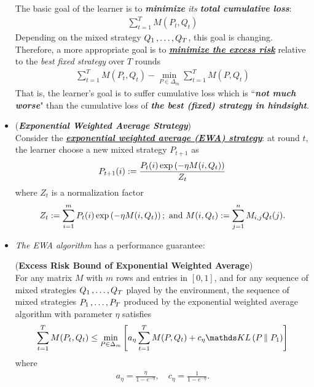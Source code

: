 \documentclass[11pt]{article}
\begin{document}
\begin{itemize}
\begin{remark}
The basic goal of the learner is to \emph{\textbf{minimize} its \textbf{total cumulative loss}}:
\begin{align*}
 \sum_{t=1}^{T}M(P_t, Q_t) 
\end{align*} Depending on the mixed strategy $Q_1 \,{,}\ldots{,}\, Q_T$, this goal is changing. Therefore, a more appropriate goal is to \underline{\emph{\textbf{minimize the excess risk}}} relative to the \emph{best fixed strategy}  over $T$ rounds
\begin{align}
\sum_{t=1}^{T}M(P_t, Q_t)  - \min_{P \in \Delta_m}\sum_{t=1}^{T}M(P, Q_t) \label{def: excess_risk_two_player_seq_game}
\end{align} That is, the learner's goal is to suffer cumulative loss which is ``\emph{\textbf{not much worse}}" than the cumulative loss of \emph{\textbf{the best (fixed) strategy in hindsight}}.
\end{remark}

\item \begin{remark}(\textbf{\emph{Exponential Weighted Average Strategy}}) \citep{cesa2006prediction} \\
Consider the \underline{\emph{\textbf{exponential weighted average (EWA) strategy}}}: at round $t$, the learner choose a new mixed strategy $P_{t+1}$ as
\begin{align*}
P_{t+1}(i) := \frac{P_{t}(i) \exp\left(- \eta M(i, Q_t)\right)}{Z_t}
\end{align*} where $Z_t$ is a normalization factor
\begin{align*}
Z_t := \sum_{i=1}^{m}P_{t}(i) \exp\left(- \eta M(i, Q_t)\right); \text{ and } M(i, Q_t) := \sum_{j=1}^{n}M_{i,j}Q_t(j).
\end{align*}
\end{remark}

\item \emph{The EWA algorithm} has a performance guarantee:
\begin{theorem} (\textbf{Excess Risk Bound of Exponential Weighted Average})  \citep{schapire2012boosting}\\
For any matrix $M$ with $m$ rows and entries in $[0, 1]$, and for any sequence of mixed strategies $Q_1 \,{,}\ldots{,}\, Q_T$ played by the environment, the sequence of mixed strategies $P_1 \,{,}\ldots{,}\, P_T$ produced by the exponential weighted average algorithm  with parameter $\eta$ satisfies
\begin{align}
\sum_{t=1}^{T}M(P_t, Q_t) \le \min_{P \in \Delta_m}\brac{a_{\eta}\sum_{t=1}^{T}M(P, Q_t) + c_{\eta} \kl{P}{P_1}  } \label{ineqn: excess_risk_bound_exp_weight_avg}
\end{align} 
where
\begin{align*}
a_{\eta} = \frac{\eta}{1 - e^{-\eta}}, \quad c_{\eta} = \frac{1}{1 - e^{-\eta}}.
\end{align*}
\end{theorem}


\end{itemize}
\end{document}

